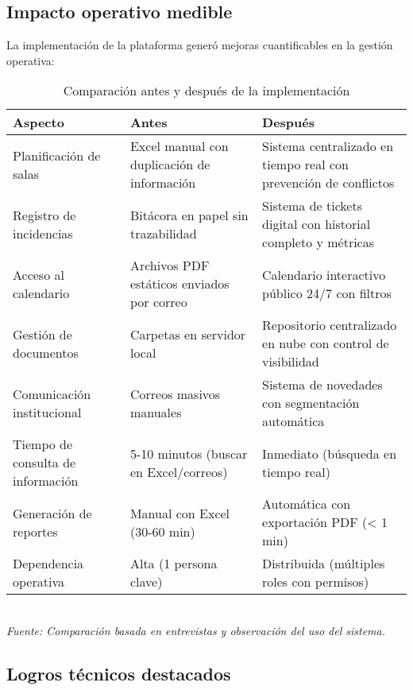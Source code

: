 \subsection{Impacto operativo medible}

La implementación de la plataforma generó mejoras cuantificables en la gestión operativa:

\begin{table}[H]
\centering
\caption{Comparación antes y después de la implementación}
\label{tab:impacto-operativo}
\begin{tabular}{p{5cm} p{4.5cm} p{4.5cm}}
\toprule
\textbf{Aspecto} & \textbf{Antes} & \textbf{Después} \\
\midrule
Planificación de salas & Excel manual con duplicación de información & Sistema centralizado en tiempo real con prevención de conflictos \\[0.2cm]

Registro de incidencias & Bitácora en papel sin trazabilidad & Sistema de tickets digital con historial completo y métricas \\[0.2cm]

Acceso al calendario & Archivos PDF estáticos enviados por correo & Calendario interactivo público 24/7 con filtros \\[0.2cm]

Gestión de documentos & Carpetas en servidor local & Repositorio centralizado en nube con control de visibilidad \\[0.2cm]

Comunicación institucional & Correos masivos manuales & Sistema de novedades con segmentación automática \\[0.2cm]

Tiempo de consulta de información & 5-10 minutos (buscar en Excel/correos) & Inmediato (búsqueda en tiempo real) \\[0.2cm]

Generación de reportes & Manual con Excel (30-60 min) & Automática con exportación PDF (< 1 min) \\[0.2cm]

Dependencia operativa & Alta (1 persona clave) & Distribuida (múltiples roles con permisos) \\
\bottomrule
\end{tabular}
\\[0.2cm]
\textit{Fuente: Comparación basada en entrevistas y observación del uso del sistema.}
\end{table}

\subsection{Logros técnicos destacados}

